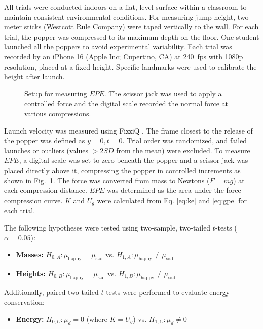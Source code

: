 \documentclass[amsmath,amssymb,aps,endfloats,linenumbers]{revtex4-2}
\begin{document}
All trials were conducted indoors on a flat, level surface within a classroom to maintain consistent environmental conditions. For measuring jump height, two meter sticks (Westcott Rule Company) were taped vertically to the wall. For each trial, the popper was compressed to its maximum depth on the floor. One student launched all the poppers to avoid experimental variability. Each trial was recorded by an iPhone 16 (Apple Inc; Cupertino, CA) at \qty{240}{fps} with \num{1080}p resolution, placed at a fixed height. Specific landmarks were used to calibrate the height after launch. 

\begin{figure}[htbp]
    \centering
     
    \caption{Setup for measuring $EPE$. The scissor jack was used to apply a controlled force and the digital scale recorded the normal force at various compressions.}
    \label{fig:setup_epe}
\end{figure}

Launch velocity was measured using FizziQ \cite{fizziq}. The frame closest to the release of the popper was defined as $y=0, t=0$. Trial order was randomized, and failed launches or outliers (values $> 2SD$ from the mean) were excluded. To measure $EPE$, a digital scale was set to zero beneath the popper and a scissor jack was placed directly above it, compressing the popper in controlled increments as shown in Fig.~\ref{fig:setup_epe}. The force was converted from mass to Newtons ($F=mg$) at each compression distance. $EPE$ was determined as the area under the force-compression curve. $K$ and $U_g$ were calculated from Eq. \ref{eq:ke} and \ref{eq:gpe} for each trial. 

The following hypotheses were tested using two-sample, two-tailed $t$-tests ($\alpha=0.05$):
\begin{itemize}
    \item \textbf{Masses:} $H_{0, A}: \mu_{\text{happy}} = \mu_{\text{sad}}$ vs. $H_{1, A}: \mu_{\text{happy}} \neq \mu_{\text{sad}}$
    \item \textbf{Heights:} $H_{0, B}: \mu_{\text{happy}} = \mu_{\text{sad}}$ vs. $H_{1, B}: \mu_{\text{happy}} \neq \mu_{\text{sad}}$
\end{itemize}
Additionally, paired two-tailed $t$-tests were performed to evaluate energy conservation:
\begin{itemize}
    \item \textbf{Energy:} $H_{0, C}: \mu_{d}= 0$ (where $K = U_g$) vs. $H_{1, C}: \mu_{d} \neq 0$
\end{itemize}
\end{document}
